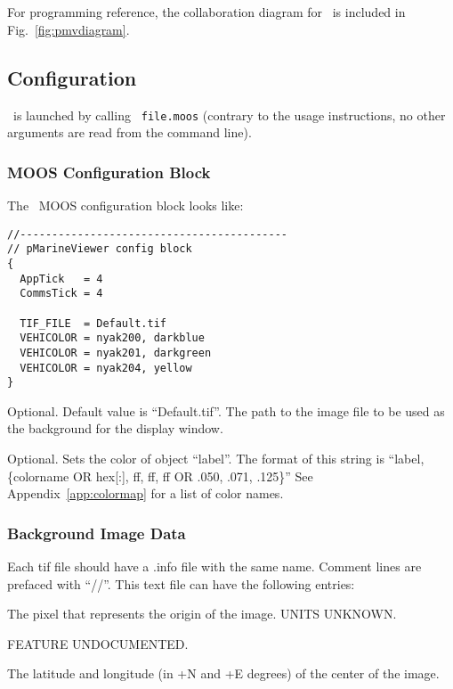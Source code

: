 \section{\pmv}
\label{pMarineViewer}
For programming reference, the collaboration diagram for \pmv\ is included in Fig.~\ref{fig:pmvdiagram}.


\subsection{Configuration}
\pmv\ is launched by calling
\scriptsize
{\tt \pmv\ file.moos}
\normalsize
(contrary to the usage instructions, no other arguments are read from the command line).

\subsubsection{MOOS Configuration Block}
The \pmv\ MOOS configuration block looks like:
\begin{verbatim}
//------------------------------------------
// pMarineViewer config block
{ 
  AppTick   = 4
  CommsTick = 4

  TIF_FILE  = Default.tif  
  VEHICOLOR = nyak200, darkblue
  VEHICOLOR = nyak201, darkgreen
  VEHICOLOR = nyak204, yellow
}
\end{verbatim}
\begin{hangpar}{\pin}{}
Optional.  Default value is ``Default.tif''.  The path to the image file to be used as the background for the display window.  
\end{hangpar}
\begin{hangpar}{\pin}{}
Optional.  Sets the color of object ``label''.  The format of this string is ``label, \{colorname OR hex[:], ff, ff, ff OR .050, .071, .125\}'' See Appendix~\ref{app:colormap} for a list of color names.
\end{hangpar}

\subsubsection{Background Image Data}
Each tif file should have a .info file with the same name.  Comment lines are prefaced with ``//''.  This text file can have the following entries:
\begin{hangpar}{\pin}{}
The pixel that represents the origin of the image.  UNITS UNKNOWN.
\end{hangpar}
\begin{hangpar}{\pin}{}
FEATURE UNDOCUMENTED.
\end{hangpar}
\begin{hangpar}{\pin}{}
The latitude and longitude (in +N and +E degrees) of the center of the image.
\end{hangpar}

